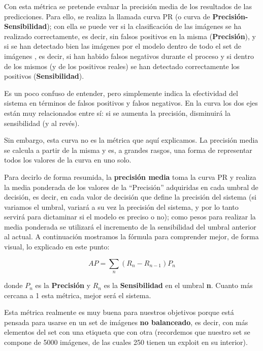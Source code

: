 Con esta métrica se pretende evaluar la precisión media de los resultados de las predicciones. Para ello, se realiza la llamada curva \ac{PR} (o curva de \textbf{Precisión-Sensibilidad}); con ella se puede ver si la clasificación de las imágenes se ha realizado correctamente, es decir, sin falsos positivos en la misma (\textbf{Precisión}), y si se han detectado bien las imágenes por el modelo dentro de todo el set de imágenes , es decir, si han habido falsos negativos durante el proceso y si dentro de los mismos (y de los positivos reales) se han detectado correctamente los positivos (\textbf{Sensibilidad}). %

Es un poco confuso de entender, pero simplemente indica la efectividad del sistema en términos de falsos positivos y falsos negativos. En la curva los dos ejes están muy relacionados entre sí: si se aumenta la precisión, disminuirá la sensibilidad (y al revés).

Sin embargo, esta  curva no es la métrica que aquí explicamos. La precisión media se calcula a partir de la misma y es, a grandes rasgos, una forma de representar todos los valores de la curva en uno solo.

Para decirlo de forma resumida, la \textbf{precisión media} toma la curva \ac{PR} y realiza la media ponderada de los valores de la ``Precisión'' adquiridas en cada umbral de decisión, es decir, en cada valor de decisión que define la precisión del sistema (si variamos el umbral, variará a su vez la precisión del sistema, y por lo tanto servirá para dictaminar si el modelo es preciso o no); como pesos para realizar la media ponderada se utilizará el incremento de la sensibilidad del umbral anterior al actual. A continuación mostramos la fórmula para comprender mejor, de forma visual, lo explicado en este punto: %

\begin{equation}\label{eq:apscore}
AP = \sum_{n}(R_n - R_{n-1})P_n
\end{equation}

donde $P_n$ es la \textbf{Precisión} y $R_n$ es la \textbf{Sensibilidad} en el umbral \textbf{n}. Cuanto más cercana a 1 esta métrica, mejor será el sistema.

Esta métrica realmente es muy buena para nuestros objetivos porque está pensada para usarse en un set de imágenes \textbf{no balanceado}, es decir, con más elementos del set con una etiqueta que con otra (recordemos que nuestro set se compone de 5000 imágenes, de las cuales 250 tienen un exploit en su interior).

